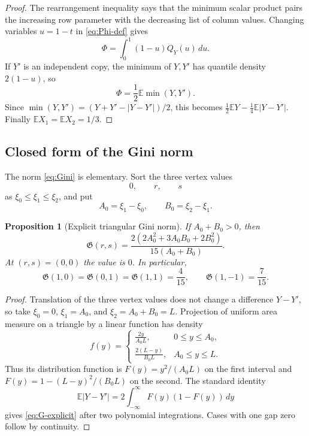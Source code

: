 \documentclass[11pt,oneside]{article}
\newtheorem{proposition}[theorem]{Proposition}
\theoremstyle{definition}
\theoremstyle{remark}
\begin{document}
\begin{proof}
The rearrangement inequality says that the minimum scalar product pairs the increasing row
parameter with the decreasing list of column values.  Changing variables $u=1-t$ in
\eqref{eq:Phi-def} gives
\[
  \Phi=\int_0^1(1-u)Q_Y(u)\,du.
\]
If $Y'$ is an independent copy, the minimum of $Y,Y'$ has quantile density
$2(1-u)$, so
\[
  \Phi=\frac12\mathbb E\min(Y,Y').
\]
Since
$\min(Y,Y')=(Y+Y'-|Y-Y'|)/2$, this becomes
$\frac12\mathbb EY-\frac14\mathbb E|Y-Y'|$.  Finally
$\mathbb EX_1=\mathbb EX_2=1/3$.
\end{proof}

\subsection{Closed form of the Gini norm}

The norm \eqref{eq:Gini} is elementary.  Sort the three vertex values
\[
  0,
  \qquad r,
  \qquad s
\]
as $\xi_0\le\xi_1\le\xi_2$, and put
\[
  A_0=\xi_1-\xi_0,
  \qquad
  B_0=\xi_2-\xi_1.
\]

\begin{proposition}[Explicit triangular Gini norm]\label{prop:G-explicit}
If $A_0+B_0>0$, then
\begin{equation}\label{eq:G-explicit}
 \mathfrak G(r,s)
 =\frac{2\left(2A_0^2+3A_0B_0+2B_0^2\right)}
        {15(A_0+B_0)}.
\end{equation}
At $(r,s)=(0,0)$ the value is $0$.  In particular,
\begin{equation}\label{eq:G-special}
  \mathfrak G(1,0)=\mathfrak G(0,1)
  =\mathfrak G(1,1)=\frac4{15},
  \qquad
  \mathfrak G(1,-1)=\frac7{15}.
\end{equation}
\end{proposition}

\begin{proof}
Translation of the three vertex values does not change a difference $Y-Y'$, so take
$\xi_0=0$, $\xi_1=A_0$, and $\xi_2=A_0+B_0=L$.  Projection of uniform area measure on a
triangle by a linear function has density
\[
 f(y)=
 \begin{cases}
 \displaystyle\frac{2y}{A_0L},&0\le y\le A_0,\\[6pt]
 \displaystyle\frac{2(L-y)}{B_0L},&A_0\le y\le L.
 \end{cases}
\]
Thus its distribution function is
$F(y)=y^2/(A_0L)$ on the first interval and
$F(y)=1-(L-y)^2/(B_0L)$ on the second.  The standard identity
\[
  \mathbb E|Y-Y'|=2\int_{-\infty}^{\infty}F(y)(1-F(y))\,dy
\]
gives \eqref{eq:G-explicit} after two polynomial integrations.  Cases with one gap zero
follow by continuity.
\end{proof}
\end{document}
